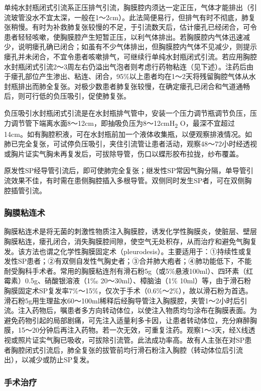 单纯水封瓶闭式引流系正压排气引流，胸膜腔内须达一定正压，气体才能排出（引流玻管没水不宜太深，一般在1～2cm）。此法简便易行，但排气有时不彻底，肺复张稍慢。有时为补救肺复张较慢的不足，于引流数天后，估计瘘孔已经闭合，可令患者轻轻咳嗽，使胸膜腔产生短暂正压，以利气体排出。若胸膜腔内气体迅速减少，说明瘘孔确已闭合；如虽有不少气体排出，但胸膜腔内气体不见减少，则提示瘘孔并未闭合，不宜令患者咳嗽排气，可继续行单纯水封瓶闭式引流。若应用胸腔水封瓶闭式引流2～3周左右仍溢出气泡者则考虑行药物粘连（见下述）。注药后由于瘘孔部位产生渗出、粘连、闭合，95\%以上患者均在1～2天将残留胸腔气体从水封瓶排出而肺全复张。对极少数患者肺复张较慢，在确定瘘孔已闭合和气道通畅后，则可行低的负压吸引，促使肺复张。

负压吸引水封瓶闭式引流是在水封瓶排气管中，安装一个压力调节瓶调节负压，压力调节管下端离水面8～12cm，即抽吸负压为8～12cmH\textsubscript{2}
O，最深不宜超过14cm。如有胸腔积液，可在水封瓶前加一个液体收集瓶，以便观察排液情况。如肺已完全复张，可试停负压吸引，夹住引流管让患者活动，观察48～72小时经透视或胸片证实气胸未再复发后，可拔除导管，伤口以蝶形胶布拉拢，纱布覆盖。

原发性SP经导管引流后，即可使肺完全复张；继发性SP常因气胸分隔，单导管引流效果不佳，有时需在患侧胸腔插入多根导管。双侧同时发生SP者，可在双侧胸腔插管引流。

\subsubsection{胸膜粘连术}

胸膜粘连术是将无菌的刺激性物质注入胸膜腔，诱发化学性胸膜炎，使脏层、壁层胸膜粘连，瘘孔闭合，消失胸膜腔间隙，使空气无处积存，从而治疗和避免气胸复发。该方法也谓之化学性胸膜固定术（pleurodesis）。主要适用于：①持续性或复发性SP患者；②有双侧自发性气胸史者；③合并肺大疱者；④肺功能低下，不能耐受胸科手术者。常用的胸膜粘连剂有滑石粉5g（或5\%悬液100ml）、四环素（红霉素）0.5g、硝酸银溶液（1‰
20～30ml）、樟脑油（1\%
10ml）等，由于滑石粉胸膜固定术SP复发率7\%～15\%，仅次于手术（0.6\%～2\%），故以滑石粉为首选。滑石粉5g用生理盐水60～100ml稀释后经胸导管注入胸膜腔，夹管1～2小时后引流。注入药物后，嘱患者多方向转动体位，以使注入物质均匀涂布在胸膜表面。为避免药物引起的局部剧痛，可先注入适量利多卡因，让患者转动体位，充分麻醉胸膜，15～20分钟后再注入药物。若一次无效，可重复注药。观察1～3天，经X线透视或照片证实气胸已吸收，可拔除引流管。此法成功率高。故有人主张在对SP患者胸腔闭式引流后，肺全复张的拔管前均行滑石粉注入胸腔（转动体位后引流出），以减少或防止SP复发。

\subsubsection{手术治疗}


